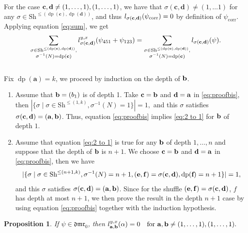\documentclass[a4paper,fleqn]{cas-sc}
\newtheorem{proposition}[theorem]{Proposition}
\DeclareMathOperator{\dep}{dp}
\begin{document}
\begin{pf}
	For the case ${\bf{c},\bf{d}}\ne (1,\dots,1),(1,\dots,1)$, we have that $\sigma(\textbf{c},\textbf{d})\ne (1,\ldots 1)$ for any $\sigma\in \text{Sh}^{\le\left(\dep(\textbf{c}), \dep(\textbf{d})\right)}$, and thus $l_{\sigma(\bf{c},\bf{d})}(\psi_{\text{corr}})=0$ by definition of $\psi_{\text{corr}}$. Applying equation \eqref{eq:sum}, we get
	\begin{equation} \label{eq:proofbis}
		\sum_{\substack{\sigma\in \text{Sh}^{\le(\dep(\textbf{c}), \dep(\textbf{d}))}, \\ \sigma^{-1}(N)=\dep(\textbf{c})}} l^{y,x}_{\sigma(\bf{c},\bf{d})}(\psi_{451}+\psi_{123}) = \sum_{\substack{\sigma\in \text{Sh}^{\le(\dep(\textbf{c}),\dep(\textbf{d}))}, \\ \sigma^{-1}(N)=\dep(\textbf{c})}} l_{\sigma(\bf{c},\bf{d})}(\psi).
	\end{equation}\\
    
    Fix $\dep(\textbf{a})=k$, we proceed by induction on the depth of $\bf{b}$.
	
	\begin{enumerate}
		\item Assume that ${\bf{b}}=(b_1)$ is of depth 1. Take $\bf{c}=\bf{b}$ and $\bf{d}=\bf{a}$ in  \eqref{eq:proofbis}, then 
            $
                |\{\sigma \mid \sigma\in \text{Sh}^{\le(1,k)},\sigma^{-1}(N)=1 \}|=1,
            $
        and this $\sigma$ satisfies $\sigma(\bf{c},\bf{d})=(a,b)$. Thus, equation \eqref{eq:proofbis} implies \eqref{eq:2 to 1} for {$\bf{b}$} of depth $1$.
        
		\item Assume that equation \eqref{eq:2 to 1} is true for any $\bf{b}$ of depth $1,\dots,n$ and suppose that the depth of $\bf{b}$ is $n+1$. We choose $\bf{c}=\bf{b}$ and $\bf{d}=\bf{a}$ in  \eqref{eq:proofbis}, then we have 
		$$
		|\{\sigma \mid \sigma\in \text{Sh}^{\le(n+1,k)},\sigma^{-1}(N)=n+1,{(\bf{e},\bf{f})=\sigma(c,d)}, \dep(\textbf{f})=n+1 \}|=1,
		$$
		and this $\sigma$ satisfies $\sigma(\bf{c},\bf{d})=(\bf{a},\bf{b})$. Since for the shuffle $(\bf{e},\bf{f})=\sigma(c,d)$, $f$ has depth at most $n+1$, we then prove the result in the depth $n+1$ case by using equation \eqref{eq:proofbis} together with the induction hypothesis.
	\end{enumerate}
\end{pf}


\begin{proposition}\label{prop:defect_admissible}
	If $\psi\in \mathfrak{dmr}_0$, then 
	$
		l^{y,x}_{{\bf{a},\bf{b}}}(\alpha)=0\quad \text{for}~ {\bf{a},\bf{b}} \ne (1,\dots,1), (1,\dots,1).
	$
\end{proposition}
\end{document}
